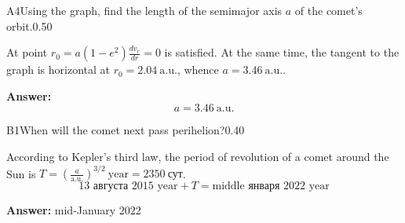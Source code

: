 \documentclass[11pt,a4paper]{article}
\begin{document}
\begin{solcard}{A4}{Using the graph, find the length of the semimajor axis $a$ of the comet's orbit.}{0.50}

At point $r_0 = a(1-e^2)\frac{dv_r}{dr}=0$ is satisfied. At the same time, the tangent to the graph is horizontal at $r_0=2.04~\text{a.u.}$, whence $a=3.46~\text{a.u.}$.

\par\smallskip\noindent\textbf{Answer:} $$a=3.46~\text{a.u.}$$
\end{solcard}

\begin{solcard}{B1}{When will the comet next pass perihelion?}{0.40}

According to Kepler's third law, the period of revolution of a comet around the Sun is $T=\left( \frac{a}{\text{a.u.}} \right)^{3/2} ~\text{year}=2350~\text{сут}$. \[\text{13 августа 2015 year} + T = \text{middle января 2022 year}\]

\par\smallskip\noindent\textbf{Answer:} mid-January 2022
\end{solcard}
\end{document}

